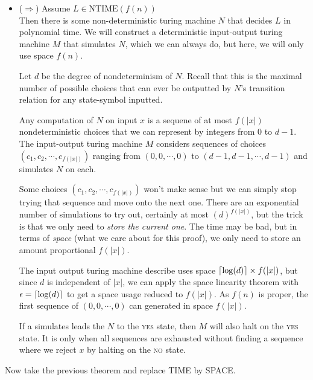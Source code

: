 \begin{itemize}   
\renewcommand{\labelitemi}{$\Box$}
\item ($\Rightarrow$) Assume $L \in \text{NTIME}(f(n))$ \\
Then there is some non-deterministic turing machine $N$ that 
decides $L$ in polynomial time. 
We will construct a deterministic input-output turing machine $M$ that simulates $N$, 
which we can always do, but here, we will only use space $f(n)$. 

Let $d$ be the degree of nondeterminism of $N$. Recall that this is 
the maximal number of possible choices that can ever be outputted by $N$'s 
transition relation for any state-symbol inputted. 

Any computation of $N$ on input $x$ is a sequene of at most $f(|x|)$ 
nondeterministic choices that we can represent by integers from 0 to $d-1$. 
The input-output turing machine $M$ considers sequences of 
choices $(c_1, c_2, \cdots, c_{f(|x|)})$ ranging from $(0,0, \cdots, 0)$ 
to $(d-1,d-1, \cdots, d-1)$ and simulates $N$ on each. 

Some choices $(c_1, c_2, \cdots, c_{f(|x|)})$ won't make sense but 
we can simply stop trying that sequence and move onto the next one. 
There are an exponential number of simulations to try out, certainly 
at most $(d)^{f(|x|)}$, but the trick is that we only need to 
\textit{store the current one}. The time may be bad, 
but in terms of \textit{space} (what we care about for this proof), 
we only need to store an amount proportional $f(|x|)$.

The input output turing machine describe uses space $\lceil\log(d)\rceil \times f(|x|)$, 
but since $d$ is independent of $|x|$, we can apply the space linearity theorem 
with $\epsilon = \lceil\log(d)\rceil$ to get a space usage reduced to $f(|x|)$. 
As $f(n)$ is proper, the first sequence of 
$(0,0, \cdots, 0)$ can generated in space $f(|x|)$. 

If a simulates leads the $N$ to the \textsc{yes} state, then $M$ 
will also halt on the \textsc{yes} state. It is only when all sequences 
are exhausted without finding a sequence where we reject $x$ 
by halting on the \textsc{no} state. 
\end{itemize}

\frmrule 

Now take the previous theorem and replace TIME by SPACE. 


